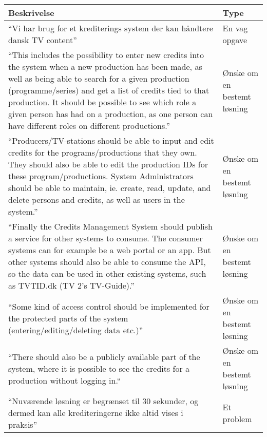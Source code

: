\begin{center}
\begin{tabular}{|p{10cm}|p{4cm}|}
\hline
\textbf{Beskrivelse} & \textbf{Type} \\
\hline
“Vi har brug for  et krediterings system der kan  håndtere  dansk TV content” 
& En vag opgave \\

\hline
“This includes the possibility to enter new credits into the system when a new production has been made, as well as being able to search for a given production (programme/series) and get a list of credits tied to that production. It should be possible to see which role a given person has had on a production, as one person can have different roles on different productions.” 
& Ønske om en bestemt løsning \\

\hline 
“Producers/TV-stations should be able to input and edit credits for the programs/productions that they own. They should also be able to edit the production IDs for these program/productions. System Administrators should be able to maintain, ie. create, read, update, and delete persons and credits, as well as users in the system.” 
& Ønske om en bestemt løsning \\

\hline
“Finally the Credits Management System should publish a service for other systems to consume. The consumer systems can for example be a web portal or an app. But other systems should also be able to consume the API, so the data can be used in other existing systems, such as TVTID.dk (TV 2’s TV-Guide).”
& Ønske om en bestemt løsning \\

\hline
“Some kind of access control should be implemented for the protected parts of the system (entering/editing/deleting data etc.)” 
& Ønske om en bestemt løsning \\

\hline
“There should also be a publicly available part of the system, where it is possible to see the credits for a production without logging in.“ 
& Ønske om en bestemt løsning \\

\hline
“Nuværende løsning er begrænset til 30 sekunder, og dermed kan alle krediteringerne ikke altid vises i praksis” 
& Et problem \\

\hline
\end{tabular}
\end{center}

